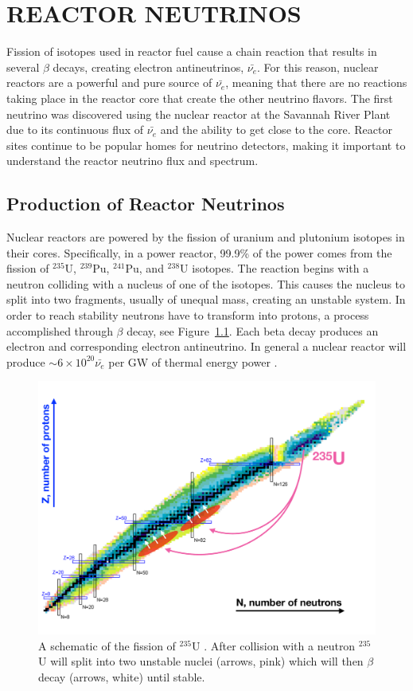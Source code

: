 \chapter{\uppercase{Reactor Neutrinos}}

Fission of isotopes used in reactor fuel cause a chain reaction that results in several  $\beta$ decays, creating electron antineutrinos, $\bar{\nu_{e}}$.
For this reason, nuclear reactors are a powerful and pure source of $\bar{\nu_{e}}$, meaning that there are no reactions taking place in the reactor core that create the other neutrino flavors.
The first neutrino was discovered using the nuclear reactor at the Savannah River Plant due to its continuous flux of $\bar{\nu_{e}}$ and the ability to get close to the core.
Reactor sites continue to be popular homes for neutrino detectors, making it important to understand the reactor neutrino flux and spectrum. 

\section{Production of Reactor Neutrinos}

Nuclear reactors are powered by the fission of uranium and plutonium isotopes in their cores. 
Specifically, in a power reactor, 99.9\% of the power comes from the fission of $^{235}$U, $^{239}$Pu, $^{241}$Pu, and $^{238}$U isotopes. 
The reaction begins with a neutron colliding with a nucleus of one of the isotopes. 
This causes the nucleus to split into two fragments, usually of unequal mass, creating an unstable system.
In order to reach stability neutrons have to transform into protons, a process accomplished through $\beta$ decay, see Figure~\ref{fig:nucchart}.
Each beta decay produces an electron and corresponding electron antineutrino. 
In general a nuclear reactor will produce $\sim 6 \times 10^{20} \bar{\nu_e}$ per GW of thermal energy power \cite{HayesVogel}.

\begin{figure}[h]
	\centering
	\includegraphics[width=0.7\linewidth]{tex/3-reactorneutrinos-images/NuclideChart_U235}
	\caption[Fission of $^{235}$U.]{A schematic of the fission of $^{235}$U \cite{NucChart}. After collision with a neutron $^{235}$U will split into two unstable nuclei (arrows, pink) which will then $\beta$ decay (arrows, white) until stable.}
	\label{fig:nucchart}
\end{figure}


